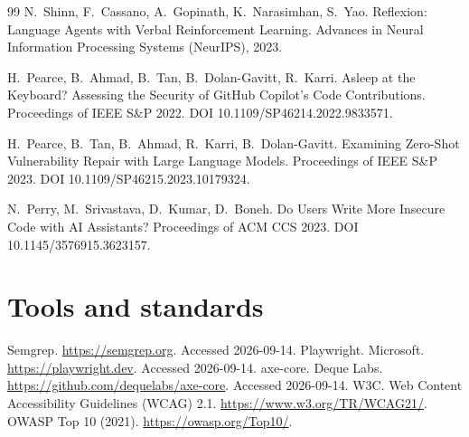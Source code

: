 \begin{thebibliography}{99}
 N.~Shinn, F.~Cassano, A.~Gopinath, K.~Narasimhan, S.~Yao.
Reflexion: Language Agents with Verbal Reinforcement Learning.
Advances in Neural Information Processing Systems (NeurIPS), 2023.

 H.~Pearce, B.~Ahmad, B.~Tan, B.~Dolan-Gavitt, R.~Karri.
Asleep at the Keyboard? Assessing the Security of GitHub Copilot's Code Contributions.
Proceedings of IEEE S\&P 2022. DOI 10.1109/SP46214.2022.9833571.

 H.~Pearce, B.~Tan, B.~Ahmad, R.~Karri, B.~Dolan-Gavitt.
Examining Zero-Shot Vulnerability Repair with Large Language Models.
Proceedings of IEEE S\&P 2023. DOI 10.1109/SP46215.2023.10179324.

 N.~Perry, M.~Srivastava, D.~Kumar, D.~Boneh.
Do Users Write More Insecure Code with AI Assistants?
Proceedings of ACM CCS 2023. DOI 10.1145/3576915.3623157.

\section*{Tools and standards}
 Semgrep. \url{https://semgrep.org}. Accessed 2026-09-14.
 Playwright. Microsoft. \url{https://playwright.dev}. Accessed 2026-09-14.
 axe-core. Deque Labs. \url{https://github.com/dequelabs/axe-core}. Accessed 2026-09-14.
 W3C. Web Content Accessibility Guidelines (WCAG) 2.1. \url{https://www.w3.org/TR/WCAG21/}.
 OWASP Top 10 (2021). \url{https://owasp.org/Top10/}.

\end{thebibliography}

